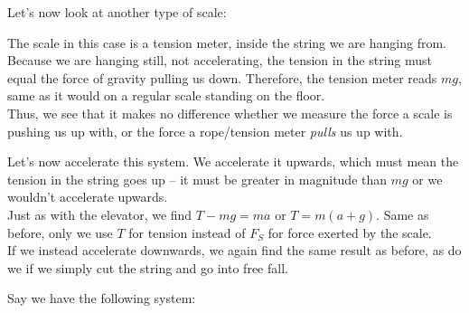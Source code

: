 Let's now look at another type of scale:

\begin{figure}[H]
  \centering
{}
\end{figure}

The scale in this case is a tension meter, inside the string we are hanging from. Because we are hanging still, not accelerating, the tension in the string must equal the force of gravity pulling us down. Therefore, the tension meter reads $m g$, same as it would on a regular scale standing on the floor.\\
Thus, we see that it makes no difference whether we measure the force a scale is pushing us up with, or the force a rope/tension meter \emph{pulls} us up with.

Let's now accelerate this system. We accelerate it upwards, which must mean the tension in the string goes up -- it must be greater in magnitude than $m g$ or we wouldn't accelerate upwards.\\
Just as with the elevator, we find $T - m g = m a$ or $T = m(a + g)$. Same as before, only we use $T$ for tension instead of $F_S$ for force exerted by the scale.\\
If we instead accelerate downwards, we again find the same result as before, as do we if we simply cut the string and go into free fall.

Say we have the following system:

\begin{figure}[H]
  \centering
{}
\end{figure}


